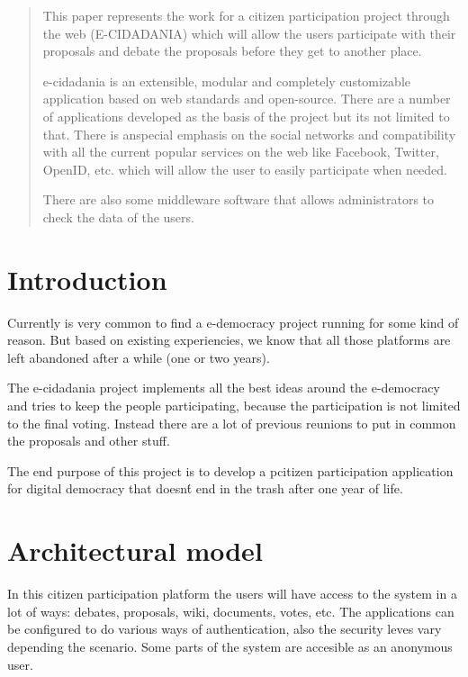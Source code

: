 \documentclass[12pt,a4paper]{article}
\begin{document}
\begin{abstract}
This paper represents the work for a citizen participation project through the web (E-CIDADANIA) which will allow the users participate with their proposals and debate the proposals before they get to another place.

e-cidadania is an extensible, modular and completely customizable application based on web standards and open-source. There are a number of applications developed as the basis of the project but its not limited to that. There is anspecial emphasis on the social networks and compatibility with all the current popular services on the web like Facebook, Twitter, OpenID, etc. which will allow the user to easily participate when needed.

There are also some middleware software that allows administrators to check the data of the users.
\end{abstract}
\newpage

\tableofcontents
\newpage

\section{Introduction}
Currently is very common to find a e-democracy project running for some kind of reason. But based on existing experiencies, we know that all those platforms are left abandoned after a while (one or two years).

The e-cidadania project implements all the best ideas around the e-democracy and tries to keep the people participating, because the participation is not limited to the final voting. Instead there are a lot of previous reunions to put in common the proposals and other stuff.

The end purpose of this project is to develop a pcitizen participation application for digital democracy that doesn\'t end in the trash after one year of life.

\section{Architectural model}
In this citizen participation platform the users will have access to the system in a lot of ways: debates, proposals, wiki, documents, votes, etc. The applications can be configured to do various ways of authentication, also the security leves vary depending the scenario. Some parts of the system are accesible as an anonymous user.
\end{document}
